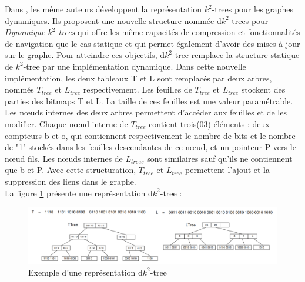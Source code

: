 Dans \citep{brisaboa2012compressed}, les même auteurs développent la représentation $k^2$-trees pour les graphes dynamiques. Ils proposent une nouvelle structure nommée d$k^2$-trees pour \textit{Dynamique $k^2$-trees} qui offre les même capacités de compression et fonctionnalités de navigation que le cas statique et qui permet également d'avoir des mises à jour sur le graphe. Pour atteindre ces objectifs, d$k^2$-tree remplace la structure statique de $k^2$-tree par une implémentation dynamique. Dans cette nouvelle implémentation, les deux tableaux T et L sont remplacés par deux arbres, nommés $T_{tree}$ et $L_{tree}$ respectivement. Les feuilles de $T_{tree}$ et $L_{tree}$ stockent des parties des bitmaps T et L. La taille de ces feuilles est une valeur paramétrable. Les nœuds internes des deux arbres permettent d'accéder aux feuilles et de les modifier.
Chaque nœud interne de $T_{tree}$ contient trois(03) éléments : deux compteurs b et o, qui contiennent respectivement le nombre de bits et le nombre de "1" stockés dans les feuilles descendantes de ce nœud, et un pointeur P vers le nœud fils. Les nœuds internes de $L_{trees}$ sont similaires sauf qu'ils ne contiennent que b et P. Avec cette structuration, $T_{tree}$ et $L_{tree}$ permettent l'ajout et la suppression des liens dans le graphe.\\
La figure \ref{dk2-trees} présente une représentation d$k^2$-tree \citep{brisaboa2012compressed}: 
\begin{figure}[H]
\begin{center}
\includegraphics[height=100 pt, width=380 pt]{./ressources/image/dk2-trees.png} 
\end{center}
\caption{Exemple d'une représentation d$k^2$-tree}
\label{dk2-trees}
\end{figure}

